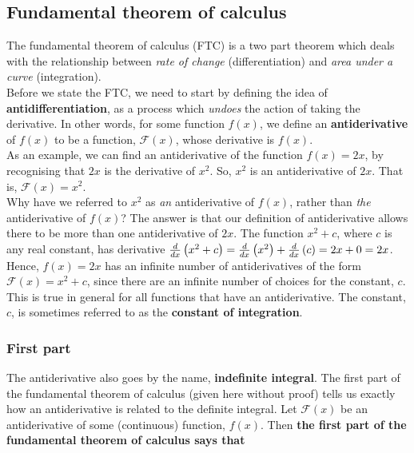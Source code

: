 \subsection{Fundamental theorem of calculus} \label{FTC} \label{indefinite integral}
The fundamental theorem of calculus (FTC) is a two part theorem which deals with the relationship between \textit{rate of change} (differentiation) and \textit{area under a curve} (integration). \\

\noindent Before we state the FTC, we need to start by defining the idea of \textbf{antidifferentiation}, as a process which \textit{undoes} the action of taking the derivative. In other words, for some function $f(x)$, we define an \textbf{antiderivative} of $f(x)$ to be a function, $\mathcal{F}(x)$, whose derivative is $f(x)$. \\

\noindent As an example, we can find an antiderivative of the function $f(x) = 2x$, by recognising that $2x$ is the derivative of $x^2$. So, $x^2$ is an antiderivative of $2x$. That is, $\mathcal{F}(x) = x^2$. \\

\noindent Why have we referred to $x^2$ as \textit{an} antiderivative of $f(x)$, rather than \textit{the} antiderivative of $f(x)$? The answer is that our definition of antiderivative allows there to be more than one antiderivative of $2x$. The function $x^2 + c$, where $c$ is any real constant, has derivative $\frac{d}{dx}\left(x^2 + c\right) = \frac{d}{dx}\left(x^2\right) + \frac{d}{dx}\left(c\right) = 2x + 0 = 2x$. Hence, $f(x) = 2x$ has an infinite number of antiderivatives of the form $\mathcal{F}(x) = x^2 + c$, since there are an infinite number of choices for the constant, $c$. This is true in general for all functions that have an antiderivative. The constant, $c$, is sometimes referred to as the \textbf{constant of integration}.  \label{constant of integration} \\


\subsubsection{First part}
\noindent The antiderivative also goes by the name, \textbf{indefinite integral}. The first part of the fundamental theorem of calculus (given here without proof) tells us exactly how an antiderivative is related to the definite integral. Let $\mathcal{F}(x)$ be an antiderivative of some (continuous) function, $f(x)$. Then \textbf{the first part of the fundamental theorem of calculus says that}

